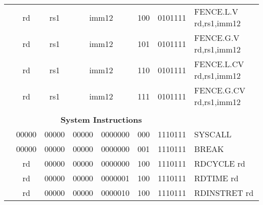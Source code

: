 \begin{table}[p]
\begin{small}
\begin{center}
\begin{tabular}{rccccccccccl}
&
\multicolumn{1}{|c|}{rd} &
\multicolumn{1}{c|}{rs1} &
\multicolumn{5}{c|}{imm12} &
\multicolumn{2}{c|}{100} &
\multicolumn{1}{c|}{0101111} & FENCE.L.V rd,rs1,imm12 \\
\cline{2-11}
  

&
\multicolumn{1}{|c|}{rd} &
\multicolumn{1}{c|}{rs1} &
\multicolumn{5}{c|}{imm12} &
\multicolumn{2}{c|}{101} &
\multicolumn{1}{c|}{0101111} & FENCE.G.V rd,rs1,imm12 \\
\cline{2-11}
  

&
\multicolumn{1}{|c|}{rd} &
\multicolumn{1}{c|}{rs1} &
\multicolumn{5}{c|}{imm12} &
\multicolumn{2}{c|}{110} &
\multicolumn{1}{c|}{0101111} & FENCE.L.CV rd,rs1,imm12 \\
\cline{2-11}
  

&
\multicolumn{1}{|c|}{rd} &
\multicolumn{1}{c|}{rs1} &
\multicolumn{5}{c|}{imm12} &
\multicolumn{2}{c|}{111} &
\multicolumn{1}{c|}{0101111} & FENCE.G.CV rd,rs1,imm12 \\
\cline{2-11}
  

&
\multicolumn{10}{c}{} & \\
&
\multicolumn{10}{c}{\bf System Instructions} & \\
\cline{2-11}
  

&
\multicolumn{1}{|c|}{00000} &
\multicolumn{1}{c|}{00000} &
\multicolumn{1}{c|}{00000} &
\multicolumn{4}{c|}{0000000} &
\multicolumn{2}{c|}{000} &
\multicolumn{1}{c|}{1110111} & SYSCALL  \\
\cline{2-11}
  

&
\multicolumn{1}{|c|}{00000} &
\multicolumn{1}{c|}{00000} &
\multicolumn{1}{c|}{00000} &
\multicolumn{4}{c|}{0000000} &
\multicolumn{2}{c|}{001} &
\multicolumn{1}{c|}{1110111} & BREAK  \\
\cline{2-11}
  

&
\multicolumn{1}{|c|}{rd} &
\multicolumn{1}{c|}{00000} &
\multicolumn{1}{c|}{00000} &
\multicolumn{4}{c|}{0000000} &
\multicolumn{2}{c|}{100} &
\multicolumn{1}{c|}{1110111} & RDCYCLE rd \\
\cline{2-11}
  

&
\multicolumn{1}{|c|}{rd} &
\multicolumn{1}{c|}{00000} &
\multicolumn{1}{c|}{00000} &
\multicolumn{4}{c|}{0000001} &
\multicolumn{2}{c|}{100} &
\multicolumn{1}{c|}{1110111} & RDTIME rd \\
\cline{2-11}
  

&
\multicolumn{1}{|c|}{rd} &
\multicolumn{1}{c|}{00000} &
\multicolumn{1}{c|}{00000} &
\multicolumn{4}{c|}{0000010} &
\multicolumn{2}{c|}{100} &
\multicolumn{1}{c|}{1110111} & RDINSTRET rd \\
\cline{2-11}
  


\end{tabular}
\end{center}
\end{small}
\end{table}
